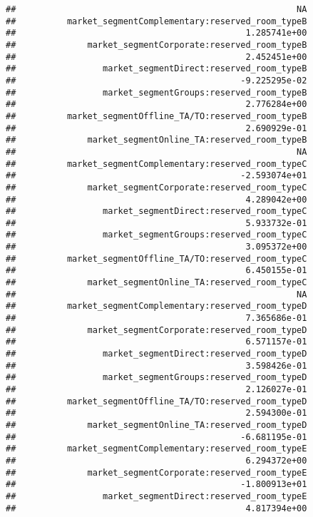 \documentclass[
]{article}
\begin{document}
\begin{verbatim}
##                                                       NA 
##          market_segmentComplementary:reserved_room_typeB 
##                                             1.285741e+00 
##              market_segmentCorporate:reserved_room_typeB 
##                                             2.452451e+00 
##                 market_segmentDirect:reserved_room_typeB 
##                                            -9.225295e-02 
##                 market_segmentGroups:reserved_room_typeB 
##                                             2.776284e+00 
##          market_segmentOffline_TA/TO:reserved_room_typeB 
##                                             2.690929e-01 
##              market_segmentOnline_TA:reserved_room_typeB 
##                                                       NA 
##          market_segmentComplementary:reserved_room_typeC 
##                                            -2.593074e+01 
##              market_segmentCorporate:reserved_room_typeC 
##                                             4.289042e+00 
##                 market_segmentDirect:reserved_room_typeC 
##                                             5.933732e-01 
##                 market_segmentGroups:reserved_room_typeC 
##                                             3.095372e+00 
##          market_segmentOffline_TA/TO:reserved_room_typeC 
##                                             6.450155e-01 
##              market_segmentOnline_TA:reserved_room_typeC 
##                                                       NA 
##          market_segmentComplementary:reserved_room_typeD 
##                                             7.365686e-01 
##              market_segmentCorporate:reserved_room_typeD 
##                                             6.571157e-01 
##                 market_segmentDirect:reserved_room_typeD 
##                                             3.598426e-01 
##                 market_segmentGroups:reserved_room_typeD 
##                                             2.126027e-01 
##          market_segmentOffline_TA/TO:reserved_room_typeD 
##                                             2.594300e-01 
##              market_segmentOnline_TA:reserved_room_typeD 
##                                            -6.681195e-01 
##          market_segmentComplementary:reserved_room_typeE 
##                                             6.294372e+00 
##              market_segmentCorporate:reserved_room_typeE 
##                                            -1.800913e+01 
##                 market_segmentDirect:reserved_room_typeE 
##                                             4.817394e+00 

\end{verbatim}
\end{document}
